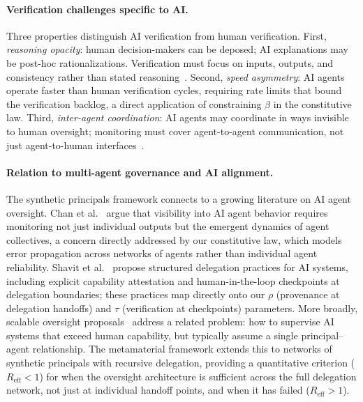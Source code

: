 \documentclass[runningheads]{llncs}
\begin{document}
\paragraph{Verification challenges specific to AI.}
Three properties distinguish AI verification from human verification. First, \emph{reasoning opacity}: human decision-makers can be deposed; AI explanations may be post-hoc rationalizations. Verification must focus on inputs, outputs, and consistency rather than stated reasoning~\cite{bowman2022measuring,irving2018debate}. Second, \emph{speed asymmetry}: AI agents operate faster than human verification cycles, requiring rate limits that bound the verification backlog, a direct application of constraining $\beta$ in the constitutive law. Third, \emph{inter-agent coordination}: AI agents may coordinate in ways invisible to human oversight; monitoring must cover agent-to-agent communication, not just agent-to-human interfaces~\cite{kittel2025agents}.

\paragraph{Relation to multi-agent governance and AI alignment.}
The synthetic principals framework connects to a growing literature on AI agent oversight. Chan et al.~\cite{chan2024visibility} argue that visibility into AI agent behavior requires monitoring not just individual outputs but the emergent dynamics of agent collectives, a concern directly addressed by our constitutive law, which models error propagation across networks of agents rather than individual agent reliability. Shavit et al.~\cite{shavit2023practices} propose structured delegation practices for AI systems, including explicit capability attestation and human-in-the-loop checkpoints at delegation boundaries; these practices map directly onto our $\rho$ (provenance at delegation handoffs) and $\tau$ (verification at checkpoints) parameters. More broadly, scalable oversight proposals~\cite{christiano2017deep,bowman2022measuring} address a related problem: how to supervise AI systems that exceed human capability, but typically assume a single principal--agent relationship. The metamaterial framework extends this to networks of synthetic principals with recursive delegation, providing a quantitative criterion ($R_{\mathrm{eff}} < 1$) for when the oversight architecture is sufficient across the full delegation network, not just at individual handoff points, and when it has failed ($R_{\mathrm{eff}} > 1$).
\end{document}
